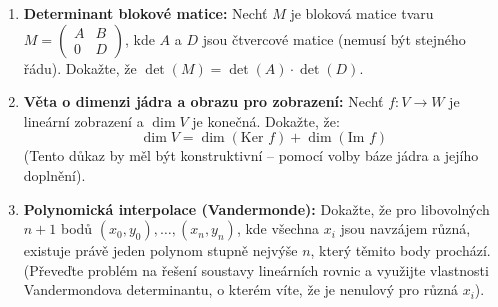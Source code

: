 \documentclass[a4paper,11pt]{article}
\begin{document}
\begin{enumerate}
    \item \textbf{Determinant blokové matice:}
    Nechť $M$ je bloková matice tvaru $M = \begin{pmatrix} A & B \\ 0 & D \end{pmatrix}$, kde $A$ a $D$ jsou čtvercové matice (nemusí být stejného řádu). Dokažte, že $\det(M) = \det(A) \cdot \det(D)$.

    \item \textbf{Věta o dimenzi jádra a obrazu pro zobrazení:}
    Nechť $f: V \to W$ je lineární zobrazení a $\dim V$ je konečná. Dokažte, že:
    $$ \dim V = \dim(\text{Ker } f) + \dim(\text{Im } f) $$
    (Tento důkaz by měl být konstruktivní – pomocí volby báze jádra a jejího doplnění).

    \item \textbf{Polynomická interpolace (Vandermonde):}
    Dokažte, že pro libovolných $n+1$ bodů $(x_0, y_0), \dots, (x_n, y_n)$, kde všechna $x_i$ jsou navzájem různá, existuje právě jeden polynom stupně nejvýše $n$, který těmito body prochází.
    (Převeďte problém na řešení soustavy lineárních rovnic a využijte vlastnosti Vandermondova determinantu, o kterém víte, že je nenulový pro různá $x_i$).

\end{enumerate}
\end{document}
